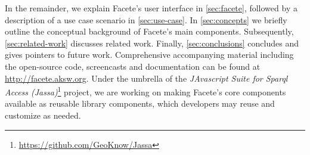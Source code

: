 In the remainder, we explain Facete's user
interface in \autoref{sec:facete},
followed by a description of a use case
scenario in \autoref{sec:use-case}.
In \autoref{sec:concepts} we briefly outline the conceptual background of Facete's main components. Subsequently,
\autoref{sec:related-work} discusses related work. Finally,
\autoref{sec:conclusions} concludes and gives pointers to
future work.
Comprehensive accompanying material including the open-source code, screencasts and documentation can be found at \url{http://facete.aksw.org}.
Under the umbrella of the
\emph{JAvascript Suite for Sparql Access
(Jassa)}\footnote{\url{https://github.com/GeoKnow/Jassa}} project, we are
working on making Facete's core components available as reusable library components,
which developers may reuse and customize as needed.






